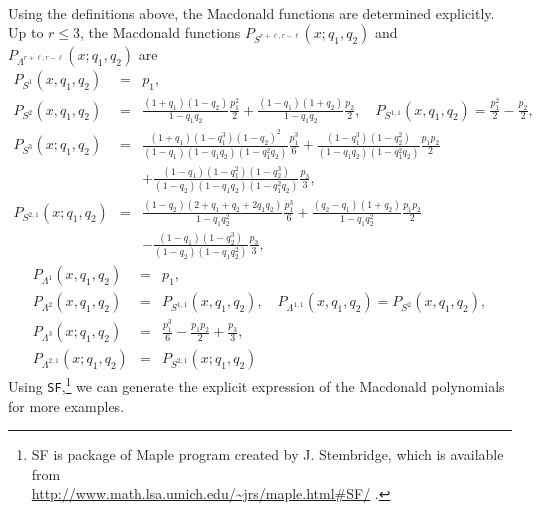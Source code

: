 \documentclass[hyper,letterpaper]{JHEP3}
\begin{document}
\\
Using the definitions above, the Macdonald functions are determined explicitly.
Up to $r\le 3$, the Macdonald functions
$P_{S^{r+\ell,r-\ell}}(x;q_1,q_2)$ and $P_{\Lambda^{r+\ell,r-\ell}}(x;q_1,q_2)$ are
\begin{eqnarray}
P_{S^1}(x,q_1,q_2)&=&p_1,
\nonumber \\
P_{S^2}(x,q_1,q_2)&=&\frac{(1+q_1)(1-q_2)}{1-q_1q_2}\frac{p_1^2}{2}+\frac{(1-q_1)(1+q_2)}{1-q_1q_2}\frac{p_2}{2},\quad
P_{S^{1,1}}(x,q_1,q_2)=\frac{p_1^2}{2}-\frac{p_2}{2},
\nonumber \\
P_{S^3}(x;q_1,q_2)
&=&\frac{(1 + q_1) (1 - q_1^3) (1 - q_2)^2}{(1-q_1)(1-q_1q_2)(1-q_1^2q_2)}\frac{p_1^3}{6}+\frac{(1-q_1^3)(1-q_2^2)}{(1-q_1q_2)(1-q_1^2q_2)}\frac{p_1p_2}{2}
\nonumber \\
&&
+\frac{(1-q_1)(1-q_1^2)(1-q_2^3)}{(1-q_2)(1-q_1q_2)(1-q_1^2q_2)}\frac{p_3}{3},
\nonumber \\
P_{S^{2,1}}(x;q_1,q_2)
&=&\frac{(1-q_2)(2 + q_1 + q_2 + 2 q_1 q_2)}{1-q_1q_2^2}\frac{p_1^3}{6}
+\frac{(q_2-q_1)(1+q_2)}{1-q_1q_2^2}\frac{p_1p_2}{2}
\nonumber \\
&&
-\frac{(1-q_1)(1-q_2^3)}{(1-q_2)(1-q_1q_2^2)}\frac{p_3}{3},
\nonumber
\end{eqnarray}
\begin{eqnarray}
P_{\Lambda^1}(x,q_1,q_2)&=&p_1,
\nonumber \\
P_{\Lambda^{2}}(x,q_1,q_2)&=&
P_{S^{1,1}}(x,q_1,q_2),\quad
P_{\Lambda^{1,1}}(x,q_1,q_2)=
P_{S^{2}}(x,q_1,q_2),
\nonumber \\
P_{\Lambda^{3}}(x;q_1,q_2)
&=&\frac{p_1^3}{6}-\frac{p_1p_2}{2}+\frac{p_3}{3},
\nonumber \\
P_{\Lambda^{2,1}}(x;q_1,q_2)&=&P_{S^{2,1}}(x;q_1,q_2)
\end{eqnarray}
Using {\tt SF},\footnote{
SF is package of Maple program created by J. Stembridge, which is available
from\\
\url{http://www.math.lsa.umich.edu/~jrs/maple.html#SF/}
.}  we can generate the explicit
expression of the Macdonald polynomials for more examples.
\end{document}

